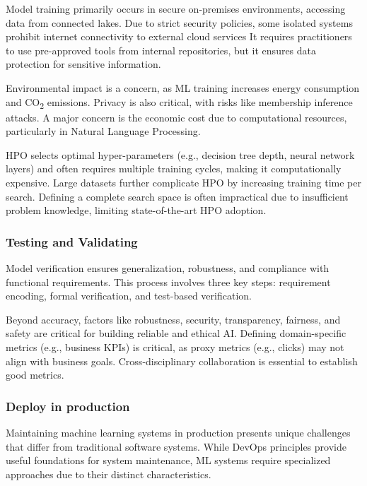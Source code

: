 Model training primarily occurs in secure on-premises environments, accessing data from connected lakes\cite{Haakman2021}.
Due to strict security policies, some isolated systems prohibit internet connectivity to external cloud services
It requires practitioners to use pre-approved tools from internal repositories, but it ensures data protection for sensitive information\cite{Haakman2021}.

Environmental impact is a concern, as ML training increases energy consumption and CO\textsubscript{2} emissions\cite{10.1145/3533378}.
Privacy is also critical, with risks like membership inference attacks\cite{10.1145/3533378, 10.1145/3555803}.
A major concern is the economic cost due to computational resources, particularly in Natural Language Processing\cite{10.1145/3533378}.

HPO selects optimal hyper-parameters (e.g., decision tree depth, neural network layers) and often requires multiple training cycles, making it computationally expensive.
Large datasets further complicate HPO by increasing training time per search\cite{10.1145/3533378}.
Defining a complete search space is often impractical due to insufficient problem knowledge, limiting state-of-the-art HPO adoption.

\subsubsection{Testing and Validating}
Model verification ensures generalization, robustness, and compliance with functional requirements.
This process involves three key steps: requirement encoding, formal verification, and test-based verification\cite{10.1145/3533378}.

Beyond accuracy, factors like robustness, security, transparency, fairness, and safety are critical for building reliable and ethical AI\cite{10.1145/3555803}.
Defining domain-specific metrics (e.g., business KPIs) is critical, as proxy metrics (e.g., clicks) may not align with business goals\cite{10.1145/3533378}.
Cross-disciplinary collaboration is essential to establish good metrics.

\subsubsection{Deploy in production}
Maintaining machine learning systems in production presents unique challenges that differ from traditional software systems.
While DevOps principles provide useful foundations for system maintenance, ML systems require specialized approaches due to their distinct characteristics\cite{10.1145/3533378}.

